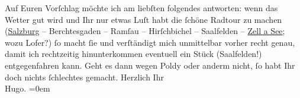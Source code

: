 \begin{ledgroupsized}[t]{13cm}
           \pstart
           Auf Euren Vorſchlag möchte ich am liebſten folgendes antworten: wenn das Wetter
                    gut wird und Ihr nur etwas Luſt habt die ſchöne Radtour zu machen (\uline{Salzburg} – Berchtesgaden – Ramſau – Hirſchbichel –
                        Saalfelden – \uline{Zell a See}; wozu Lofer?) ſo macht ſie und
                    verſtändigt {\pb}mich unmittelbar
                    vorher \introOben{}recht genau\introOben{}, damit ich rechtzeitig
                    hinunterkommen eventuell ein Stück (Saalfelden!) entgegenfahren kann. Geht es dann wegen Poldy oder anderm nicht, ſo habt Ihr doch nichts
                    ſchlechtes gemacht.\pend
           \pstart
           Herzlich Ihr{\\[\baselineskip]}\spacefill\mbox{Hugo.}\pend
           \leftskip=0em{}
         
         \endnumbering{}\end{ledgroupsized}  \newcommand{\dateiname}{L00703}\newcommand{\titel}{Hugo von Hofmannsthal an Arthur Schnitzler, 16. [7. 1897]}\newcommand{\editorInnen}{Martin Anton Müller und Gerd-Hermann Susen}
      
